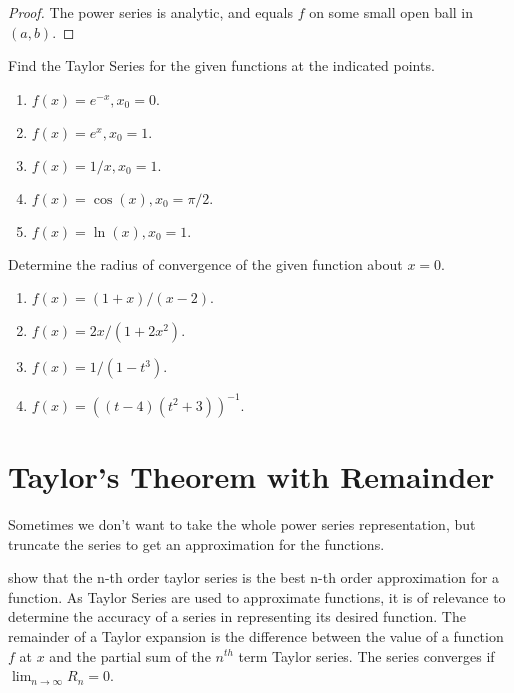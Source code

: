 \begin{proof}
    The power series is analytic, and equals $f$ on some small open ball in $(a,b)$.
\end{proof}
\exercises
\begin{exerciselist}
    \item Find the Taylor Series for the given functions at the indicated points. \begin{enumerate}[label=(\alph*)]
        \item $f(x) = e^{-x}, x_0 = 0.$
        \item $f(x) = e^x, x_0 = 1.$ 
        \item $f(x)=1/x, x_0 = 1.$
        \item $f(x) = \cos(x), x_0 = \pi/2.$ 
        \item $f(x) = \ln(x), x_0 = 1.$
    \end{enumerate}
    \item Determine the radius of convergence of the given function about $x=0$. \begin{enumerate}[label=(\alph*)]
        \item $f(x) = (1+x)/(x-2).$
        \item $f(x) = 2x/(1+2x^2).$
        \item $f(x) = 1/(1-t^3).$
        \item $f(x) = ((t-4)(t^2+3))^{-1}.$
    \end{enumerate} 
\end{exerciselist}

\section{Taylor's Theorem with Remainder}
Sometimes we don't want to take the whole power series representation, but truncate the series to get an approximation for the functions.

\todo show that the n-th order taylor series is the best n-th order approximation for a function.
As Taylor Series are used to approximate functions, it is of relevance to determine the accuracy of a series in representing its desired function. 
The remainder of a Taylor expansion is the difference between the value of a function $f$ at $x$ and the partial sum of the $n^{th}$ term Taylor series. The series converges if $\lim_{n \rightarrow \infty} R_n = 0$. 


